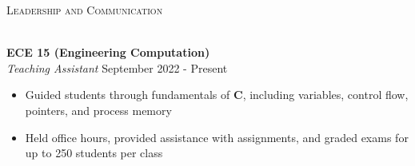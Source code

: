 \documentclass[a4paper]{article}
\newcommand{\lineunder} {
    \vspace*{-8pt} \\
    \hspace*{-18pt} \hrulefill \\
}
\newcommand{\header} [1] {
    {\hspace*{-18pt}\vspace*{6pt} \textsc{#1}}
    \vspace*{-6pt} \lineunder
}
\newenvironment{entry}[4][]{
  \textbf{#2} \hfill #1 \\
  \textit{#3} \hfill #4 \\
  \vspace{-2mm}
  \begin{itemize} \itemsep 0em
  }
  {
  \end{itemize}
}
\begin{document}
\begin{comment}
\begin{entry}{ACM Meme Gen}{Full Stack Web Development}{June 2019 - December 2019}
\item Created a meme generator as a supplement for students to learn \textbf{MongoDB}, \textbf{Express}, \textbf{React}, and \textbf{Node.js}
\item Implemented \textbf{React} components and state management, called the
  Imgflip API for templates
\item \textbf{MongoDB} back-end used to store user-created memes for a central gallery
\end{entry}

\begin{entry}{Infantry Firmware - Robomaster}{Firmware, Circuit Design}{January 2019 - August 2019}
\item Implemented control firmware on \textbf{STM32} chip for a 2-DOF turret mounted on a 4-wheel robot
\item Angle control of motors achieved using sensor data from \textbf{encoders} and \textbf{IMU}
  over \textbf{UART} and \textbf{I2C} with \textbf{PID}
\item Designed and soldered power circuit with supercaps in parallel with
  battery to circumvent power restrictions
\end{entry}

\begin{entry}{Reef Pin}{Firmware, Circuit Design}{November 2018 - June 2019}
\item Designed and tested system for a device used to measure depth for coral reef mapping
\item Used a MS5803-14BA pressure sensor to measure depth and an MLX90393 magnetometer for cardinal direction
\item Used \textbf{I2C} to retrieve sensor data and communicate with LED driver, logged data to an SD card using \textbf{SPI}
\end{entry}
\end{comment}
\header{Leadership and Communication}
\vspace{1mm}

\begin{entry}{ECE 15 (Engineering Computation)}{Teaching Assistant}{September 2022 - Present}
  \item Guided students through fundamentals of \textbf{C},
    including variables, control flow, pointers, and process memory 
  \item Held office hours, provided assistance with assignments, and graded exams for up to 250 students per class
\end{entry}
\end{document}
